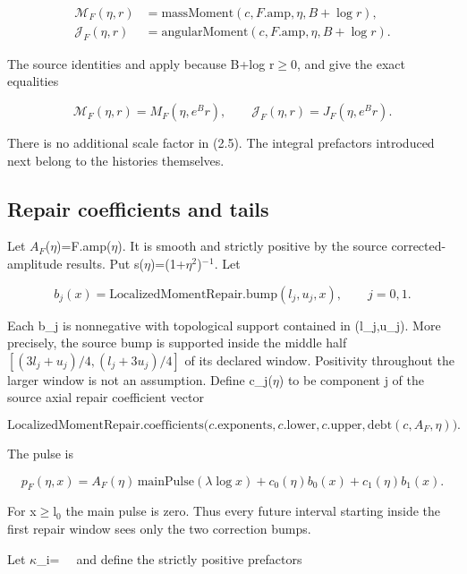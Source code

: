 \documentclass[11pt,a4paper]{article}
\begin{document}
\[
\begin{aligned}
\mathcal M_F(\eta,r)&=\mathrm{massMoment}(c,F.\mathrm{amp},\eta,B+\log r),\\
\mathcal J_F(\eta,r)&=\mathrm{angularMoment}(c,F.\mathrm{amp},\eta,B+\log r).
\end{aligned}
\]

The source identities  and  apply because B+log r\ensuremath{\ge}0, and give the exact equalities

\[
\mathcal M_F(\eta,r)=M_F(\eta,e^B r),\qquad
\mathcal J_F(\eta,r)=J_F(\eta,e^B r). \tag{2.5}
\]

There is no additional scale factor in (2.5). The integral prefactors introduced next belong to the histories themselves.

\subsection{Repair coefficients and tails}

Let \(A_F\)(\ensuremath{\eta})=F.amp(\ensuremath{\eta}). It is smooth and strictly positive by the source corrected-amplitude results. Put s(\ensuremath{\eta})=(1+\ensuremath{\eta}\ensuremath{{}^{2}})\ensuremath{{}^{-}}\ensuremath{{}^{1}}. Let

\[
b_j(x)=\mathrm{LocalizedMomentRepair.bump}(l_j,u_j,x),\qquad j=0,1.
\]

Each b\_j is nonnegative with topological support contained in (l\_j,u\_j). More precisely, the source bump is supported inside the middle half
\([(3l_j+u_j)/4,(l_j+3u_j)/4]\) of its declared window. Positivity throughout the larger window is not an assumption. Define c\_j(\ensuremath{\eta}) to be component j of the source axial repair coefficient vector

\[
\mathrm{LocalizedMomentRepair.coefficients}
\bigl(c.\mathrm{exponents},c.\mathrm{lower},c.\mathrm{upper},
\mathrm{debt}(c,A_F,\eta)\bigr).
\]

The pulse is

\[
p_F(\eta,x)=A_F(\eta)\,\mathrm{mainPulse}(\lambda\log x)
               +c_0(\eta)b_0(x)+c_1(\eta)b_1(x). \tag{2.6}
\]

For x\ensuremath{\ge}l\ensuremath{{}_0} the main pulse is zero. Thus every future interval starting inside the first repair window sees only the two correction bumps.

Let \ensuremath{\kappa}\_i=\texttt{\allowbreak\ \allowbreak\ } and define the strictly positive prefactors
\end{document}
